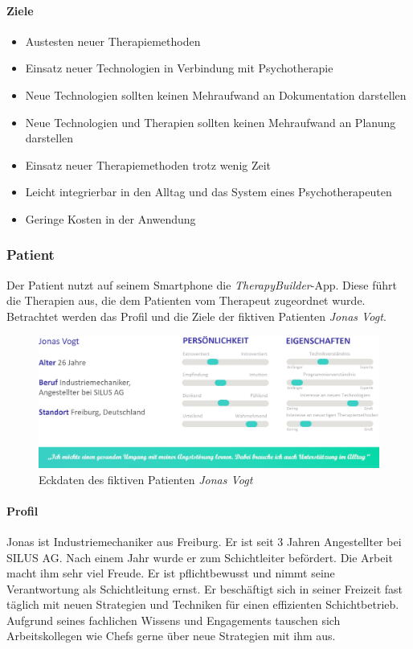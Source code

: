 \paragraph{Ziele}
\begin{itemize}
\item Austesten neuer Therapiemethoden
\item Einsatz neuer Technologien in Verbindung mit Psychotherapie
\item Neue Technologien sollten keinen Mehraufwand an Dokumentation darstellen
\item Neue Technologien und Therapien sollten keinen Mehraufwand an Planung darstellen
\item Einsatz neuer Therapiemethoden trotz wenig Zeit
\item Leicht integrierbar in den Alltag und das System eines Psychotherapeuten
\item Geringe Kosten in der Anwendung
\end{itemize}

\subsubsection{Patient}
Der Patient nutzt auf seinem Smartphone die \emph{TherapyBuilder}-App. Diese führt die Therapien aus, die dem Patienten vom Therapeut zugeordnet wurde. Betrachtet werden das Profil und die Ziele der fiktiven Patienten \emph{Jonas Vogt}.

\begin{figure}[h]
\centering
\includegraphics[width=1\textwidth]{pictures/patient}
\caption{Eckdaten des fiktiven Patienten \emph{Jonas Vogt}}
\label{patient}
\end{figure}

\paragraph{Profil}
Jonas ist Industriemechaniker aus Freiburg. Er ist seit 3 Jahren Angestellter bei SILUS AG. Nach einem Jahr wurde er zum Schichtleiter befördert. Die Arbeit macht ihm sehr viel Freude. Er ist pflichtbewusst und nimmt seine Verantwortung als Schichtleitung ernst. Er beschäftigt sich in seiner Freizeit fast täglich mit neuen Strategien und Techniken für einen effizienten Schichtbetrieb. Aufgrund seines fachlichen Wissens und Engagements tauschen sich Arbeitskollegen wie Chefs gerne über neue Strategien mit ihm aus.

